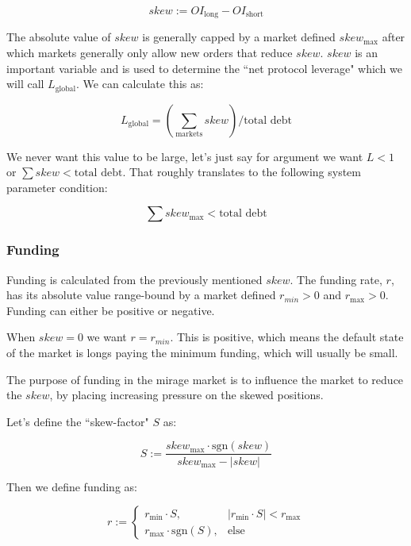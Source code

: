 \documentclass[letterpaper]{article}
\begin{document}
\begin{multicols}{2}
\begin{equation}
    \label{eq:skew}
    skew := OI_{\text{long}} - OI_{\text{short}}
\end{equation}

The absolute value of $skew$ is generally capped by a market defined $skew_{\text{max}}$ after which markets generally only allow new orders that reduce $skew$. $skew$ is an important variable and is used to determine the ``net protocol leverage" which we will call $L_{\text{global}}$. We can calculate this as:

\begin{equation}
    L_{\text{global}} = (\sum_{\text{markets}}skew) / \text{total debt} 
\end{equation}

We never want this value to be large, let's just say for argument we want $L < 1$ or $\sum skew < \text{total debt}$. That roughly translates to the following system parameter condition:

\begin{equation}
    \sum skew_{\text{max}} < \text{total debt}
\end{equation}

\subsubsection{Funding}

Funding is calculated from the previously mentioned $skew$. The funding rate, $r$, has its absolute value range-bound by a market defined $r_{min} > 0$ and $r_{\text{max}} > 0$. Funding can either be positive or negative.

When $skew=0$ we want $r=r_{min}$. This is positive, which means the default state of the market is longs paying the minimum funding, which will usually be small.

The purpose of funding in the mirage market is to influence the market to reduce the $skew$, by placing increasing pressure on the skewed positions. 

Let's define the ``skew-factor" $S$ as:

\begin{equation}
    \label{eq:skew-factor}
    S := \frac{skew_{\text{max}} \cdot \text{sgn}(skew)}{skew_{\text{max}} - |skew|}
\end{equation}

Then we define funding as:

\begin{equation}
    \label{eq:funding}
    r := \begin{cases}
        r_{\text{min}} \cdot S, & |r_{\text{min}} \cdot S| < r_{\text{max}} \\
        r_{\text{max}} \cdot \text{sgn}(S), & \text{else}
    \end{cases}
\end{equation}


\end{multicols}
\end{document}
